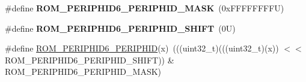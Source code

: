 \begin{DoxyCompactItemize}
\mbox{\label{group___m_t_b___register___masks_gae29765428defa80237980d34b67f4fde}} 
\#define {\bfseries R\+O\+M\+\_\+\+P\+E\+R\+I\+P\+H\+I\+D6\+\_\+\+P\+E\+R\+I\+P\+H\+I\+D\+\_\+\+M\+A\+SK}~(0x\+F\+F\+F\+F\+F\+F\+F\+F\+U)
\item 
\mbox{\label{group___m_t_b___register___masks_ga0cb9b85e1ca798d1897bcef6afce8a79}} 
\#define {\bfseries R\+O\+M\+\_\+\+P\+E\+R\+I\+P\+H\+I\+D6\+\_\+\+P\+E\+R\+I\+P\+H\+I\+D\+\_\+\+S\+H\+I\+FT}~(0\+U)
\item 
\#define \mbox{\hyperlink{group___m_t_b___register___masks_gacd2a1a4b870a765537be3a9aaae25cba}{R\+O\+M\+\_\+\+P\+E\+R\+I\+P\+H\+I\+D6\+\_\+\+P\+E\+R\+I\+P\+H\+ID}}(x)~(((uint32\+\_\+t)(((uint32\+\_\+t)(x)) $<$$<$ R\+O\+M\+\_\+\+P\+E\+R\+I\+P\+H\+I\+D6\+\_\+\+P\+E\+R\+I\+P\+H\+I\+D\+\_\+\+S\+H\+I\+FT)) \& R\+O\+M\+\_\+\+P\+E\+R\+I\+P\+H\+I\+D6\+\_\+\+P\+E\+R\+I\+P\+H\+I\+D\+\_\+\+M\+A\+SK)
\end{DoxyCompactItemize}
